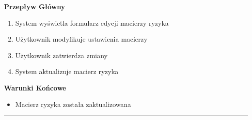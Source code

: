 \vspace{0.2cm}
\noindent\textbf{Przepływ Główny}
\begin{enumerate}
    \item System wyświetla formularz edycji macierzy ryzyka
    \item Użytkownik modyfikuje ustawienia macierzy
    \item Użytkownik zatwierdza zmiany
    \item System aktualizuje macierz ryzyka
\end{enumerate}

\vspace{0.2cm}
\noindent\textbf{Warunki Końcowe}
\begin{itemize}
    \item Macierz ryzyka została zaktualizowana
\end{itemize}


\hrule
\vspace{1cm}
\newpage

